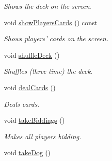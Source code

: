 \begin{DoxyCompactItemize}
\begin{DoxyCompactList}\small\item\em Shows the deck on the screen. \end{DoxyCompactList}\item 
\hypertarget{classGame_aed6d30748ef9db0a89fba543fa4b5dfb}{void \hyperlink{classGame_aed6d30748ef9db0a89fba543fa4b5dfb}{show\-Players\-Cards} () const }\label{classGame_aed6d30748ef9db0a89fba543fa4b5dfb}

\begin{DoxyCompactList}\small\item\em Shows players' cards on the screen. \end{DoxyCompactList}\item 
\hypertarget{classGame_a8eb0a092d23b426a8b4b03c4083b7afe}{void \hyperlink{classGame_a8eb0a092d23b426a8b4b03c4083b7afe}{shuffle\-Deck} ()}\label{classGame_a8eb0a092d23b426a8b4b03c4083b7afe}

\begin{DoxyCompactList}\small\item\em Shuffles (three time) the deck. \end{DoxyCompactList}\item 
\hypertarget{classGame_a234bc66c5663548d90368ecd142591b2}{void \hyperlink{classGame_a234bc66c5663548d90368ecd142591b2}{deal\-Cards} ()}\label{classGame_a234bc66c5663548d90368ecd142591b2}

\begin{DoxyCompactList}\small\item\em Deals cards. \end{DoxyCompactList}\item 
\hypertarget{classGame_ae8240e18a7b5ed1adec7663278afc256}{void \hyperlink{classGame_ae8240e18a7b5ed1adec7663278afc256}{take\-Biddings} ()}\label{classGame_ae8240e18a7b5ed1adec7663278afc256}

\begin{DoxyCompactList}\small\item\em Makes all players bidding. \end{DoxyCompactList}\item 
\hypertarget{classGame_ab725d07327db4dfb836e90eb08c83393}{void \hyperlink{classGame_ab725d07327db4dfb836e90eb08c83393}{take\-Dog} ()}\label{classGame_ab725d07327db4dfb836e90eb08c83393}


\end{DoxyCompactItemize}
